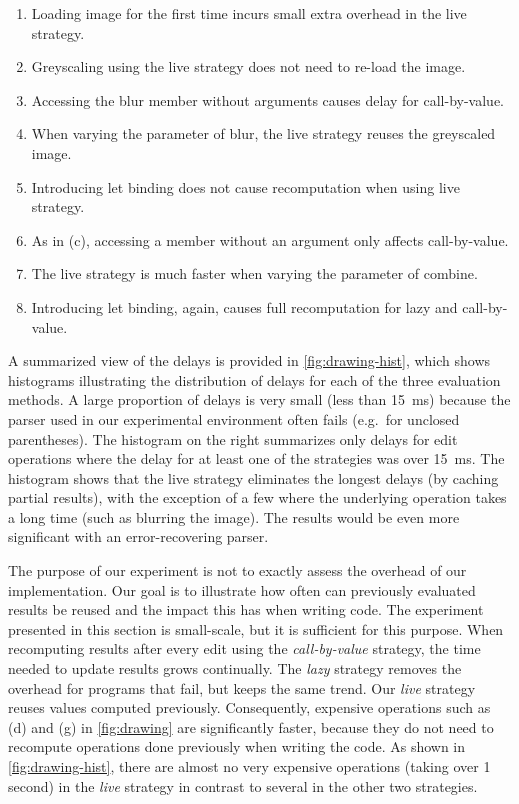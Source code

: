 \documentclass[english,crc,references=cleveref]{programming}
\theoremstyle{plain}
\theoremstyle{definition}
\begin{document}
\begin{enumerate}
  \renewcommand{\theenumi}{\alph{enumi}}%
\item Loading image for the first time incurs small extra overhead in the live strategy.
\item Greyscaling using the live strategy does not need to re-load the image.
\item Accessing the blur member without arguments causes delay for call-by-value.
\item When varying the parameter of blur, the live strategy reuses the greyscaled image.
\item Introducing let binding does not cause recomputation when using live strategy.
\item As in (c), accessing a member without an argument only affects call-by-value.
\item The live strategy is much faster when varying the parameter of combine.
\item Introducing let binding, again, causes full recomputation for lazy and call-by-value.
\end{enumerate}
%
%
A summarized view of the delays is provided in \cref{fig:drawing-hist}, which shows
histograms illustrating the distribution of delays for each of the three evaluation methods.
A large proportion of delays is very small (less than \SI{15}{\ms}) because the parser used in our
experimental environment often fails (e.\hairspace g.~for unclosed parentheses). The histogram
on the right summarizes only delays for edit operations where the delay for at least one of
the strategies was over \SI{15}{\ms}. The histogram shows that the live strategy eliminates the longest
delays (by caching partial results), with the exception of a few where the underlying operation
takes a long time (such as blurring the image). The results would be even more significant with
an error-recovering parser.

The purpose of our experiment is not to exactly assess the overhead of our implementation.
Our goal is to illustrate how often can previously evaluated results be reused and the impact
this has when writing code. The experiment presented in this section is small-scale, but it is
sufficient for this purpose. When recomputing results after every edit
using the \emph{call-by-value} strategy, the time needed to update results grows
continually. The \emph{lazy} strategy removes the overhead for programs that fail, but
keeps the same trend. Our \emph{live} strategy reuses values computed
previously. Consequently, expensive operations such as (d) and (g) in \cref{fig:drawing}
are significantly faster, because they do not need to recompute operations done previously when
writing the code. As shown in \cref{fig:drawing-hist}, there are almost no very expensive
operations (taking over 1 second) in the \emph{live} strategy in contrast to several in the
other two strategies.
\end{document}
